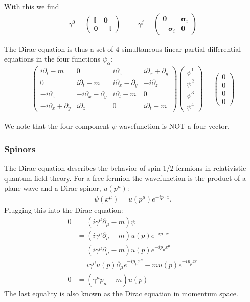 \documentclass{book}
\theoremstyle{definition}
\newcommand{\p}{\partial}
\newcommand{\nn}{\nonumber}
\begin{document}
With this we find 
\begin{align}
\boxed{\gamma^0 = \begin{pmatrix}
\mathbb{I} & \mathbf{0} \\ \mathbf{0} & -\mathbb{I}
\end{pmatrix} \hspace{1cm} \gamma^j = \begin{pmatrix}
\mathbf{0} & \mathbf{\sigma}_i \\ -\mathbf{\sigma}_i & \mathbf{0}
\end{pmatrix}}
\end{align}


The Dirac equation is thus a set of 4 simultaneous linear partial differential equations in the four functions $\psi_\alpha$:
\begin{align}
\boxed{\begin{pmatrix}
i\p_t - m & 0 &i\p_z&i\p_x + \p_y  \\
0 & i\p_t - m&i\p_x - \p_y & -i\p_z\\
-i\p_z & -i\p_x - \p_y & i\p_t - m &0\\
 -i\p_x + \p_y  &i\p_z&0& i\p_t - m
\end{pmatrix}
\begin{pmatrix}
\psi^1 \\ \psi^2 \\ \psi^3 \\ \psi^4
\end{pmatrix} = \begin{pmatrix}
0\\0\\0\\0
\end{pmatrix}}
\end{align}

We note that the four-component $\psi$ wavefunction is NOT a four-vector. 









\subsubsection{Spinors}
The Dirac equation describes the behavior of spin-1/2 fermions in relativistic quantum field theory. For a free fermion the wavefunction is the product of a plane wave and a Dirac spinor, $u(p^\mu)$:
\begin{align}
\psi(x^\mu) = u(p^\mu)e^{-ip\cdot x}.
\end{align}
Plugging this into the Dirac equation:
\begin{align}
0 &= (i\gamma^\mu \p_\mu - m)\psi  \nn\\
&=  (i\gamma^\mu \p_\mu - m)u(p)e^{-ip\cdot x} \nn\\
&= (i\gamma^\mu \p_\mu - m)u(p)e^{-ip_\mu x^\mu} \nn\\
&=  i\gamma^\mu u(p)\p_\mu  e^{-ip_\mu x^\mu}     - mu(p)e^{-ip_\mu x^\mu} \nn\\
0 &=  \boxed{(\gamma^\mu p_\mu - m)u(p)} 
\end{align}
The last equality is also known as the {Dirac equation in momentum space}.
\end{document}
